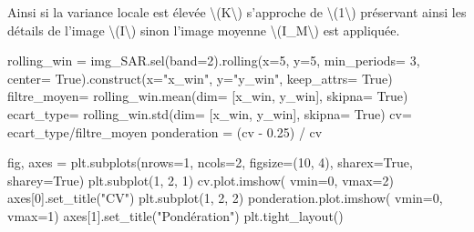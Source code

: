 \documentclass[
]{article}
\newenvironment{Shaded}{}{}
\newcommand{\DecValTok}[1]{\textcolor[rgb]{0.25,0.63,0.44}{#1}}
\newcommand{\FloatTok}[1]{\textcolor[rgb]{0.25,0.63,0.44}{#1}}
\newcommand{\NormalTok}[1]{#1}
\newcommand{\OperatorTok}[1]{\textcolor[rgb]{0.40,0.40,0.40}{#1}}
\newcommand{\StringTok}[1]{\textcolor[rgb]{0.25,0.44,0.63}{#1}}
\newcommand{\VariableTok}[1]{\textcolor[rgb]{0.10,0.09,0.49}{#1}}
\begin{document}
Ainsi si la variance locale est élevée {\textbackslash(K\textbackslash)}
s'approche de {\textbackslash(1\textbackslash)} préservant ainsi les
détails de l'image {\textbackslash(I\textbackslash)} sinon l'image
moyenne {\textbackslash(I\_M\textbackslash)} est appliquée.

\label{e9df9b62}
\label{cb28}
\begin{Shaded}
\begin{Highlighting}[]
\NormalTok{rolling\_win }\OperatorTok{=}\NormalTok{ img\_SAR.sel(band}\OperatorTok{=}\DecValTok{2}\NormalTok{).rolling(x}\OperatorTok{=}\DecValTok{5}\NormalTok{, y}\OperatorTok{=}\DecValTok{5}\NormalTok{,  min\_periods}\OperatorTok{=} \DecValTok{3}\NormalTok{, center}\OperatorTok{=} \VariableTok{True}\NormalTok{).construct(x}\OperatorTok{=}\StringTok{"x\_win"}\NormalTok{, y}\OperatorTok{=}\StringTok{"y\_win"}\NormalTok{, keep\_attrs}\OperatorTok{=} \VariableTok{True}\NormalTok{)}
\NormalTok{filtre\_moyen}\OperatorTok{=}\NormalTok{ rolling\_win.mean(dim}\OperatorTok{=}\NormalTok{ [}\StringTok{\textquotesingle{}x\_win\textquotesingle{}}\NormalTok{, }\StringTok{\textquotesingle{}y\_win\textquotesingle{}}\NormalTok{], skipna}\OperatorTok{=} \VariableTok{True}\NormalTok{)}
\NormalTok{ecart\_type}\OperatorTok{=}\NormalTok{ rolling\_win.std(dim}\OperatorTok{=}\NormalTok{ [}\StringTok{\textquotesingle{}x\_win\textquotesingle{}}\NormalTok{, }\StringTok{\textquotesingle{}y\_win\textquotesingle{}}\NormalTok{], skipna}\OperatorTok{=} \VariableTok{True}\NormalTok{)}
\NormalTok{cv}\OperatorTok{=}\NormalTok{ ecart\_type}\OperatorTok{/}\NormalTok{filtre\_moyen}
\NormalTok{ponderation }\OperatorTok{=}\NormalTok{ (cv }\OperatorTok{{-}} \FloatTok{0.25}\NormalTok{) }\OperatorTok{/}\NormalTok{ cv}

\NormalTok{fig, axes }\OperatorTok{=}\NormalTok{ plt.subplots(nrows}\OperatorTok{=}\DecValTok{1}\NormalTok{, ncols}\OperatorTok{=}\DecValTok{2}\NormalTok{, figsize}\OperatorTok{=}\NormalTok{(}\DecValTok{10}\NormalTok{, }\DecValTok{4}\NormalTok{), sharex}\OperatorTok{=}\VariableTok{True}\NormalTok{, sharey}\OperatorTok{=}\VariableTok{True}\NormalTok{)}
\NormalTok{plt.subplot(}\DecValTok{1}\NormalTok{, }\DecValTok{2}\NormalTok{, }\DecValTok{1}\NormalTok{)}
\NormalTok{cv.plot.imshow( vmin}\OperatorTok{=}\DecValTok{0}\NormalTok{, vmax}\OperatorTok{=}\DecValTok{2}\NormalTok{)}
\NormalTok{axes[}\DecValTok{0}\NormalTok{].set\_title(}\StringTok{"CV"}\NormalTok{)}
\NormalTok{plt.subplot(}\DecValTok{1}\NormalTok{, }\DecValTok{2}\NormalTok{, }\DecValTok{2}\NormalTok{)}
\NormalTok{ponderation.plot.imshow( vmin}\OperatorTok{=}\DecValTok{0}\NormalTok{, vmax}\OperatorTok{=}\DecValTok{1}\NormalTok{) }
\NormalTok{axes[}\DecValTok{1}\NormalTok{].set\_title(}\StringTok{"Pondération"}\NormalTok{)}
\NormalTok{plt.tight\_layout()}
\end{Highlighting}
\end{Shaded}
\end{document}
